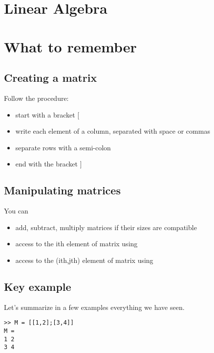\section{Linear Algebra}

\section{What to remember}
\subsection{Creating a matrix}
Follow the procedure:
\begin{itemize}
	\item start with a bracket [
	\item write each element of a column, separated with space or commas
	\item separate rows with a semi-colon
	\item end with the bracket ]
\end{itemize}

\subsection{Manipulating matrices}
You can
\begin{itemize}
	\item add, subtract, multiply matrices if their sizes are compatible
	\item access to the ith element of matrix  using 
	\item access to the (ith,jth) element of matrix  using 
\end{itemize}	

\subsection{Key example}
Let's summarize in a few examples everything we have seen.

\begin{lstlisting}
>> M = [[1,2];[3,4]]
M = 
1 2 
3 4

\end{lstlisting}




















